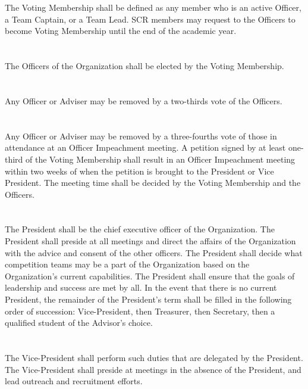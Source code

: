 \documentclass[12pt]{cls/constitution}
\begin{document}
\section{}
The Voting Membership shall be defined as any member who is an active Officer, a Team Captain, or a Team Lead. SCR members may request to the Officers to become Voting Membership until the end of the academic year.

\section{}
The Officers of the Organization shall be elected by the Voting Membership.

\section{}
Any Officer or Adviser may be removed by a two-thirds vote of the Officers.

\section{}
Any Officer or Adviser may be removed by a three-fourths vote of those in attendance at an Officer Impeachment meeting. A petition signed by at least one-third of the Voting Membership shall result in an Officer Impeachment meeting within two weeks of when the petition is brought to the President or Vice President. The meeting time shall be decided by the Voting Membership and the Officers.

\section{}
The President shall be the chief executive officer of the Organization. The President shall preside at all meetings and direct the affairs of the Organization with the advice and consent of the other officers.  The President shall decide what competition teams may be a part of the Organization based on the Organization’s current capabilities. The President shall ensure that the goals of leadership and success are met by all. In the event that there is no current President, the remainder of the President’s term shall be filled in the following order of succession:  Vice-President, then Treasurer, then Secretary, then a qualified student of the Advisor’s choice.

\section{}
The Vice-President shall perform such duties that are delegated by the President. The Vice-President shall preside at meetings in the absence of the President, and lead outreach and recruitment efforts. 
\end{document}
